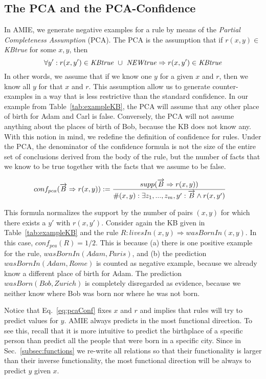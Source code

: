 \subsection{The PCA and the PCA-Confidence}\label{subsubsec:pcaConf}

In AMIE, we generate negative examples for a rule by means of the \emph{Partial Completeness Assumption} (PCA).
The PCA is the assumption that if $r(x,y) \in$ \emph{KBtrue} for some $x,y$, then
\[\forall y': r(x,y') \in \mbox{\emph{KBtrue}}\ \cup\ \mbox{\emph{NEWtrue}} \Rightarrow r(x,y') \in \mbox{\emph{KBtrue}}\]
In other words, we assume that if we know one $y$ for a given $x$ and $r$, then we know all $y$ for that $x$ and $r$.
This assumption allow us to generate counter-examples in a way that is less restrictive than the standard confidence.
In our example from Table~\ref{tab:exampleKB}, the PCA will assume that any other place of birth for
Adam and Carl is false. Conversely, the PCA will not assume anything about the places of birth of Bob, because
the KB does not know any.
With this notion in mind, we redefine the definition of confidence for rules. Under the PCA,
the denominator of the confidence formula is not the size of the entire set of conclusions
derived from the body of the rule,
but the number of facts that we know to be true together with the facts that we assume to be false.

\begin{small}
\begin{equation} \label{eq:pcaConf}
 \hspace*{-2ex}
conf_{pca}(\vec{B} \Rightarrow r(x,y)) := \frac{supp(\vec{B} \Rightarrow r(x,y))}{\#(x,y): \exists z_1,...,z_m,y': \vec{B} \wedge r(x,y')}
\end{equation}
\end{small}

This formula normalizes the support by the number of pairs $(x,y)$ for which there exists a $y'$ with $r(x,y')$.
Consider again the KB given in Table~\ref{tab:exampleKB} and the rule $R: livesIn(x,y)\Rightarrow wasBornIn(x,y)$. In this case, $conf_{pca}(R)=1/2$. This is because (a) there is one positive example for the rule, $wasBornIn(Adam, Paris)$, and (b) the prediction $wasBornIn(Adam, Rome)$ is counted as negative example, because we already know a different place of birth for Adam. The prediction $wasBorn(Bob,Zurich)$ is completely disregarded as evidence, because we neither know where Bob was born nor where he was not born.

Notice that Eq.~\ref{eq:pcaConf} fixes $x$ and $r$ and implies that rules will try to predict values for $y$.
AMIE always predicts in the most functional direction. To see this, recall that
it is more intuitive to predict the birthplace of a specific person
than predict all the people that were born in a specific city.
Since in Sec.~\ref{subsec:functions} we re-write all relations so that their functionality
is larger than their inverse functionality, the most functional direction
will be always to predict $y$ given $x$.

